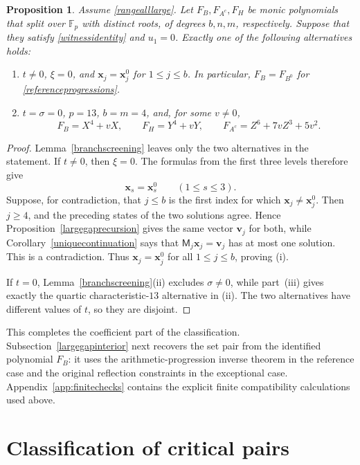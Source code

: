 \documentclass[10pt,a4paper]{amsart}
\newtheorem{proposition}{Proposition}[section]
\newcommand{\F}{\mathbb{F}_p}
\begin{document}
\begin{proposition}\label{coefficientrigidity}
Assume \eqref{rangealllarge}.  Let $F_B,F_{A^c},F_H$ be monic
polynomials that split over $\F$ with distinct roots, of degrees
$b,n,m$, respectively.  Suppose that they satisfy
\eqref{witnessidentity} and $u_1=0$.  Exactly one of the following
alternatives holds:
\begin{enumerate}[label=\textup{(\roman*)},nosep]
\item $t\ne0$, $\xi=0$, and
$\mathbf x_j=\mathbf x_j^0$ for $1\le j\le b$.
In particular, $F_B=F_{B^0}$ for \eqref{referenceprogressions}.
\item $t=\sigma=0$, $p=13$, $b=m=4$, and, for some $v\ne0$,
\[
 F_B=X^4+vX,\qquad F_H=Y^4+vY,\qquad
 F_{A^c}=Z^6+7vZ^3+5v^2.
\]
\end{enumerate}
\end{proposition}
\begin{proof}
Lemma~\ref{branchscreening} leaves only the two alternatives in
the statement.  If $t\ne0$, then $\xi=0$.  The formulas from the first
three levels therefore give
\[
 \mathbf x_s=\mathbf x_s^0\qquad(1\le s\le3).
\]
Suppose, for contradiction, that $j\le b$ is the first index for which
$\mathbf x_j\ne\mathbf x_j^0$.  Then $j\ge4$, and the preceding states
of the two solutions agree.  Hence Proposition~\ref{largegaprecursion}
gives the same vector $\mathbf v_j$ for both, while
Corollary~\ref{uniquecontinuation} says that
$\mathsf M_j\mathbf x_j=\mathbf v_j$ has at most one solution.  This is
a contradiction.  Thus
$\mathbf x_j=\mathbf x_j^0$ for all $1\le j\le b$, proving
\textup{(i)}.

If $t=0$, Lemma~\ref{branchscreening}(ii) excludes
$\sigma\ne0$, while part~\textup{(iii)} gives exactly the quartic
characteristic-$13$ alternative in \textup{(ii)}.  The two alternatives
have different values of $t$, so they are disjoint.
\end{proof}

This completes the coefficient part of the classification.
Subsection~\ref{largegapinterior} next recovers the set pair from the
identified polynomial $F_B$: it uses the arithmetic-progression inverse
theorem in the reference case and the original reflection constraints
in the exceptional case.  Appendix~\ref{app:finitechecks} contains the explicit finite
compatibility calculations used above.

\section{Classification of critical pairs}\label{classification}
\end{document}
